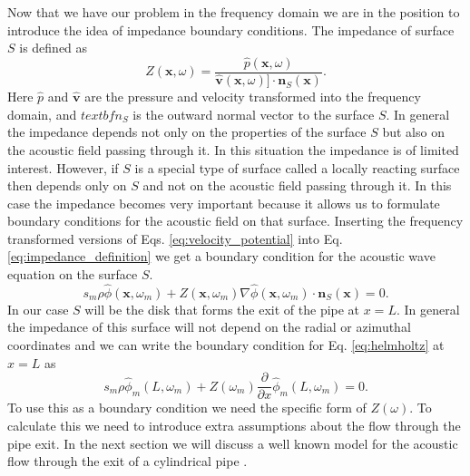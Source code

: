 \documentclass[12pt, letter]{report}
\begin{document}
Now that we have our problem in the frequency domain we are in the position to introduce the idea of impedance boundary conditions. The impedance of surface $S$ is defined as 
\begin{equation}
\label{eq:impedance_definition}
Z(\textbf{x}, \omega) = \frac{\hat{p}(\textbf{x}, \omega)}{\hat{\textbf{v}}(\textbf{x}, \omega)] \cdot \textbf{n}_S(\textbf{x})}.
\end{equation}
Here $\hat{p}$ and $\hat{\textbf{v}}$ are the pressure and velocity transformed into the frequency domain, and $textbf{n}_S$ is the outward normal vector to the surface $S$. In general the impedance depends not only on the properties of the surface $S$ but also on the acoustic field passing through it. In this situation the impedance is of limited interest. However, if $S$ is a special type of surface called a locally reacting surface then depends only on $S$ and not on the acoustic field passing through it. In this case the impedance becomes very important because it allows us to formulate boundary conditions for the acoustic field on that surface. Inserting the frequency transformed versions of Eqs. \ref{eq:velocity_potential} into Eq. \ref{eq:impedance_definition} we get a boundary condition for the acoustic wave equation on the surface $S$.
\begin{equation}
s_m \rho \hat{\phi}(\textbf{x}, \omega_m) + Z(\textbf{x}, \omega_m) \nabla \hat{\phi}(\textbf{x}, \omega_m) \cdot \textbf{n}_S(\textbf{x}) = 0.
\end{equation}
In our case $S$ will be the disk that forms the exit of the pipe at $x=L$. In general the impedance of this surface will not depend on the radial or azimuthal coordinates and we can write the boundary condition for Eq. \ref{eq:helmholtz} at $x=L$ as 
\begin{equation}
\label{eq:boundary_two}
s_m \rho \hat{\phi}_m(L, \omega_m) + Z(\omega_m) \frac{\partial }{\partial x}\hat{\phi}_m(L, \omega_m)= 0.
\end{equation}
To use this as a boundary condition we need the specific form of $Z(\omega)$. To calculate this we need to introduce extra assumptions about the flow through the pipe exit. In the next section we will discuss a well known model for the acoustic flow through the exit of a cylindrical pipe \cite{fletcher2012physics}.
\end{document}
